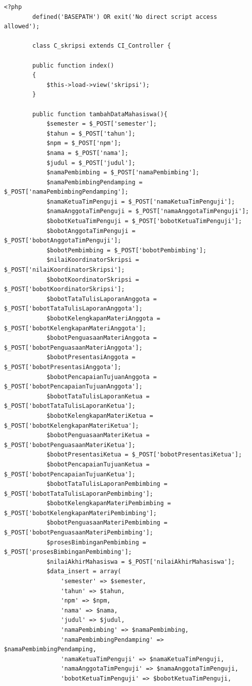 	\begin{lstlisting}[caption= File Controller, label= ciController]
		<?php
		defined('BASEPATH') OR exit('No direct script access allowed');
		
		class C_skripsi extends CI_Controller {
		
		public function index()
		{
			$this->load->view('skripsi');
		}
		
		public function tambahDataMahasiswa(){
			$semester = $_POST['semester'];
			$tahun = $_POST['tahun'];
			$npm = $_POST['npm'];
			$nama = $_POST['nama'];
			$judul = $_POST['judul'];
			$namaPembimbing = $_POST['namaPembimbing'];
			$namaPembimbingPendamping = $_POST['namaPembimbingPendamping'];
			$namaKetuaTimPenguji = $_POST['namaKetuaTimPenguji'];
			$namaAnggotaTimPenguji = $_POST['namaAnggotaTimPenguji'];
			$bobotKetuaTimPenguji = $_POST['bobotKetuaTimPenguji'];
			$bobotAnggotaTimPenguji = $_POST['bobotAnggotaTimPenguji'];
			$bobotPembimbing = $_POST['bobotPembimbing'];
			$nilaiKoordinatorSkripsi = $_POST['nilaiKoordinatorSkripsi'];
			$bobotKoordinatorSkripsi = $_POST['bobotKoordinatorSkripsi'];
			$bobotTataTulisLaporanAnggota = $_POST['bobotTataTulisLaporanAnggota'];
			$bobotKelengkapanMateriAnggota = $_POST['bobotKelengkapanMateriAnggota'];
			$bobotPenguasaanMateriAnggota = $_POST['bobotPenguasaanMateriAnggota'];
			$bobotPresentasiAnggota = $_POST['bobotPresentasiAnggota'];
			$bobotPencapaianTujuanAnggota = $_POST['bobotPencapaianTujuanAnggota'];
			$bobotTataTulisLaporanKetua = $_POST['bobotTataTulisLaporanKetua'];
			$bobotKelengkapanMateriKetua = $_POST['bobotKelengkapanMateriKetua'];
			$bobotPenguasaanMateriKetua = $_POST['bobotPenguasaanMateriKetua'];
			$bobotPresentasiKetua = $_POST['bobotPresentasiKetua'];
			$bobotPencapaianTujuanKetua = $_POST['bobotPencapaianTujuanKetua'];
			$bobotTataTulisLaporanPembimbing = $_POST['bobotTataTulisLaporanPembimbing'];
			$bobotKelengkapanMateriPembimbing = $_POST['bobotKelengkapanMateriPembimbing'];
			$bobotPenguasaanMateriPembimbing = $_POST['bobotPenguasaanMateriPembimbing'];
			$prosesBimbinganPembimbing = $_POST['prosesBimbinganPembimbing'];
			$nilaiAkhirMahasiswa = $_POST['nilaiAkhirMahasiswa'];
			$data_insert = array(
				'semester' => $semester,
				'tahun' => $tahun,
				'npm' => $npm,
				'nama' => $nama,
				'judul' => $judul,
				'namaPembimbing' => $namaPembimbing,
				'namaPembimbingPendamping' => $namaPembimbingPendamping,
				'namaKetuaTimPenguji' => $namaKetuaTimPenguji,
				'namaAnggotaTimPenguji' => $namaAnggotaTimPenguji,
				'bobotKetuaTimPenguji' => $bobotKetuaTimPenguji,

\end{lstlisting}
